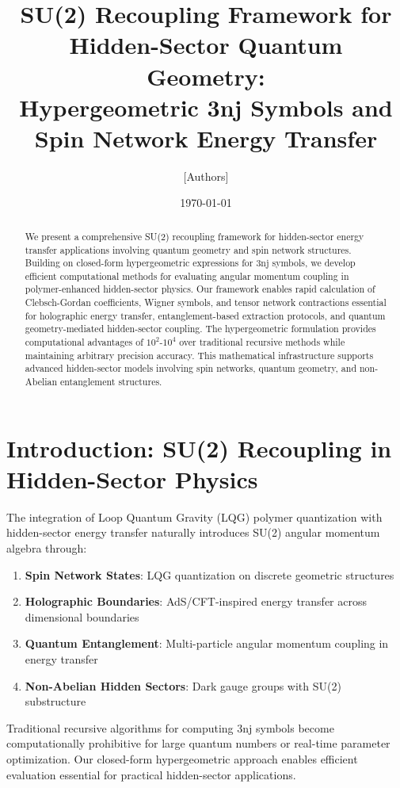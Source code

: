 \documentclass[12pt]{article}
\title{SU(2) Recoupling Framework for Hidden-Sector Quantum Geometry: \\ Hypergeometric 3nj Symbols and Spin Network Energy Transfer}
\author{[Authors]}
\date{\today}
\begin{document}
\maketitle

\begin{abstract}
We present a comprehensive SU(2) recoupling framework for hidden-sector energy transfer applications involving quantum geometry and spin network structures. Building on closed-form hypergeometric expressions for 3nj symbols, we develop efficient computational methods for evaluating angular momentum coupling in polymer-enhanced hidden-sector physics. Our framework enables rapid calculation of Clebsch-Gordan coefficients, Wigner symbols, and tensor network contractions essential for holographic energy transfer, entanglement-based extraction protocols, and quantum geometry-mediated hidden-sector coupling. The hypergeometric formulation provides computational advantages of $10^2$-$10^4$ over traditional recursive methods while maintaining arbitrary precision accuracy. This mathematical infrastructure supports advanced hidden-sector models involving spin networks, quantum geometry, and non-Abelian entanglement structures.
\end{abstract}

\section{Introduction: SU(2) Recoupling in Hidden-Sector Physics}

The integration of Loop Quantum Gravity (LQG) polymer quantization with hidden-sector energy transfer naturally introduces SU(2) angular momentum algebra through:

\begin{enumerate}
\item \textbf{Spin Network States}: LQG quantization on discrete geometric structures
\item \textbf{Holographic Boundaries}: AdS/CFT-inspired energy transfer across dimensional boundaries
\item \textbf{Quantum Entanglement}: Multi-particle angular momentum coupling in energy transfer
\item \textbf{Non-Abelian Hidden Sectors}: Dark gauge groups with SU(2) substructure
\end{enumerate}

Traditional recursive algorithms for computing 3nj symbols become computationally prohibitive for large quantum numbers or real-time parameter optimization. Our closed-form hypergeometric approach enables efficient evaluation essential for practical hidden-sector applications.
\end{document}
